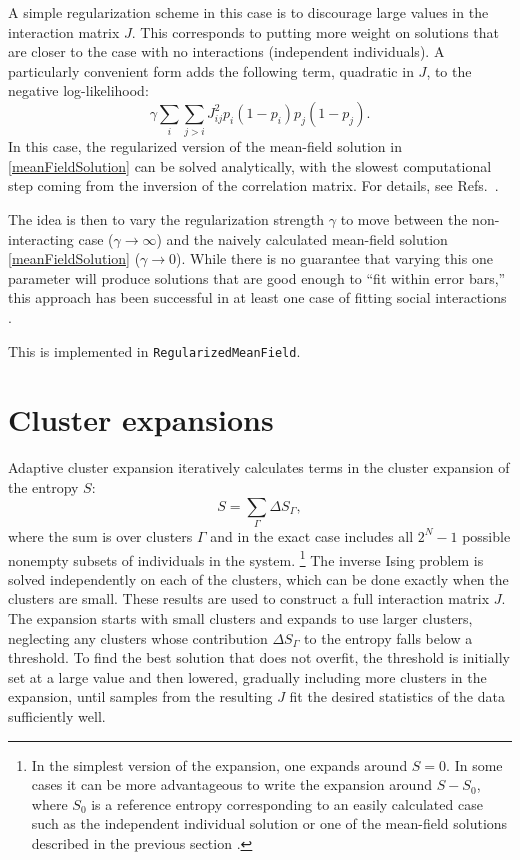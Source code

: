 \documentclass[aps,prl,twocolumn]{revtex4-1}
\begin{document}
A simple regularization scheme in this case is to discourage large values in the interaction
matrix $J$.  This corresponds to putting more weight on solutions that are closer to
the case with no interactions (independent individuals).  A particularly convenient form
adds the following term, quadratic in $J$, to the negative log-likelihood:
\begin{equation}
\gamma \sum_i \sum_{j > i} J_{ij}^2 p_i (1-p_i) p_j (1-p_j).
\end{equation}
In this case, the regularized version of the mean-field solution in \eqref{meanFieldSolution}
can be solved analytically, with the slowest computational step coming from the inversion
of the correlation matrix.  For details, see Refs.~\cite{DanKraFla17,BarCoc13}.

The idea is then to vary the regularization strength $\gamma$ to move between the
non-interacting case ($\gamma \rightarrow \infty$) and the naively calculated
mean-field solution \eqref{meanFieldSolution} ($\gamma \rightarrow 0$).
While there is no guarantee that varying this one parameter will produce solutions that are
good enough to ``fit within error bars,'' this approach has been successful in at least
one case of fitting social interactions \cite{DanKraFla17}.

This is implemented in {\tt RegularizedMeanField}.



\section{Cluster expansions}

Adaptive cluster expansion \cite{CocMon11,CocMon12,BarCoc13}
iteratively calculates terms in the
cluster expansion of the entropy $S$:
\begin{equation}
S = \sum_\Gamma \Delta S_\Gamma,
\end{equation}
where the sum is over clusters $\Gamma$ and in the exact case
includes all $2^N - 1$ possible nonempty subsets of individuals in the system.
\footnote{In the simplest version of the expansion,
one expands around $S=0$.  In some cases it can be more advantageous to write the
expansion around $S-S_0$, where $S_0$ is a reference entropy corresponding to
an easily calculated case such as
the independent individual solution or one of the mean-field solutions
described in the previous section \cite{BarCoc13}.}
The inverse Ising problem is solved independently
on each of the clusters, which can be done exactly when the
clusters are small.  These results are used to construct a full
interaction matrix $J$.
The expansion starts with small clusters and expands to use larger
clusters, neglecting any clusters whose
contribution $\Delta S_\Gamma$ to the entropy falls below a threshold.
To find the best solution that does not overfit,
the threshold is initially set at a large value and then lowered,
gradually including more clusters in the expansion, until samples from
the resulting $J$ fit the desired statistics of the data sufficiently well.
\end{document}
